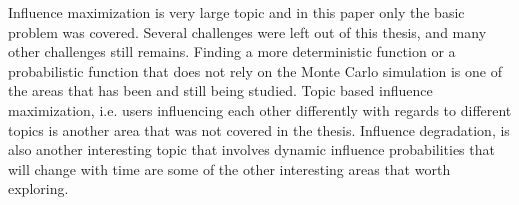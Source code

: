 \documentclass[english]{tktltiki}
\begin{document}
Influence maximization is very large topic and in this paper only the basic problem was covered. Several challenges were left out of this thesis, and many other challenges still remains. Finding a more deterministic function or a probabilistic function that does not rely on the Monte Carlo simulation is one of the areas that has been and still being studied. Topic based influence maximization, i.e. users influencing each other differently with regards to different topics is another area that was not covered in the thesis. Influence degradation, is also another interesting topic that involves dynamic influence probabilities that will change with time are some of the other interesting areas that worth exploring.

\pagebreak





\lastpage
\appendices
\pagestyle{empty}
\end{document}
